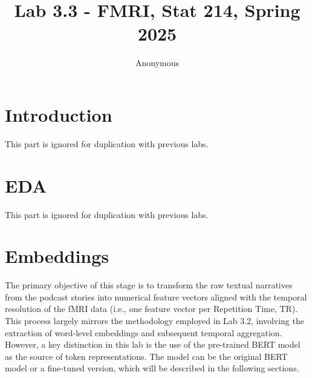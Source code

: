 \documentclass[10pt,letterpaper]{article}
\title{Lab 3.3 - FMRI, Stat 214, Spring 2025}
\author{Anonymous}
\begin{document}
\maketitle

\section{Introduction}

This part is ignored for duplication with previous labs.

\section{EDA}

This part is ignored for duplication with previous labs.

\section{Embeddings}

The primary objective of this stage is to transform the raw textual narratives from the podcast stories into numerical feature vectors aligned with the temporal resolution of the fMRI data (i.e., one feature vector per Repetition Time, TR). This process largely mirrors the methodology employed in Lab 3.2, involving the extraction of word-level embeddings and subsequent temporal aggregation. However, a key distinction in this lab is the use of the pre-trained BERT model \cite{devlin2019bert} as the source of token representations. The model can be the original BERT model or a fine-tuned version, which will be described in the following sections.
\end{document}
